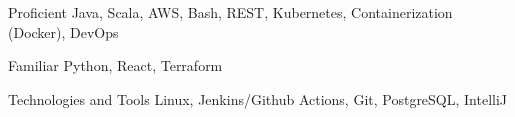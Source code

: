 
\begin{cvskills}

  \cvskill
    {Proficient}
    {Java, Scala, AWS, Bash, REST, Kubernetes, Containerization (Docker), DevOps}

  \cvskill
    {Familiar}
    {Python, React, Terraform}

  \cvskill
    {Technologies and Tools}
    {Linux, Jenkins/Github Actions, Git, PostgreSQL, IntelliJ}

\end{cvskills}

